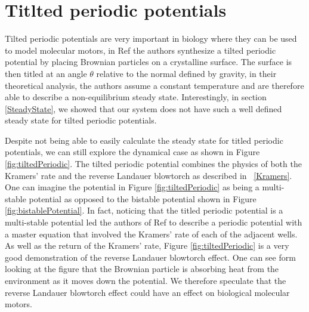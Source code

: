 
\section{Titlted periodic potentials}
Tilted periodic potentials are very important in biology where they can be used to model molecular motors, in Ref \cite{MaLaiAckersonEtAl2015, MaLaiAckersonEtAl2015a} the authors synthesize a tilted periodic potential by placing Brownian particles on a crystalline surface. The surface is then titled at an angle $\theta$ relative to the normal defined by gravity, in their theoretical analysis, the authors assume a constant temperature and are therefore able to describe a non-equilibrium steady state. Interestingly, in section \ref{SteadyState}, we showed that our system does not have such a well defined steady state for tilted periodic potentials.

Despite not being able to easily calculate the steady state for titled periodic potentials, we can still explore the dynamical case as shown in Figure \ref{fig:tiltedPeriodic}. The tilted periodic potential combines the physics of both the Kramers' rate and the reverse Landauer blowtorch as described in ~\autoref{Kramers}. One can imagine the potential in Figure \ref{fig:tiltedPeriodic} as being a multi-stable potential as opposed to the bistable potential shown in Figure \ref{fig:bistablePotential}. In fact, noticing that the titled periodic potential is a multi-stable potential led the authors of Ref \cite{ChallisJack2014} to describe a periodic potential with a master equation that involved the Kramers' rate of each of the adjacent wells. As well as the return of the Kramers' rate, Figure \ref{fig:tiltedPeriodic} is a very good demonstration of the reverse Landauer blowtorch effect. One can see form looking at the figure that the Brownian particle is absorbing heat from the environment as it moves down the potential. We therefore speculate that the reverse Landauer blowtorch effect could have an effect on biological molecular motors.


